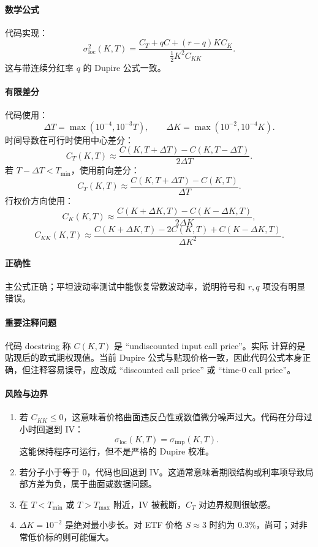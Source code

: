\documentclass[UTF8,a4paper,11pt]{ctexart}
\newcommand{\code}[1]{\texttt{\detokenize{#1}}}
\begin{document}
\paragraph{数学公式}
代码实现：
\[
\sigma_{\mathrm{loc}}^2(K,T)
=
\frac{
C_T+qC+(r-q)KC_K
}{
\frac12K^2C_{KK}
}.
\]
这与带连续分红率 \(q\) 的 Dupire 公式一致。

\paragraph{有限差分}
代码使用：
\[
\Delta T=\max(10^{-4},10^{-3}T),
\qquad
\Delta K=\max(10^{-2},10^{-4}K).
\]
时间导数在可行时使用中心差分：
\[
C_T(K,T)\approx
\frac{C(K,T+\Delta T)-C(K,T-\Delta T)}{2\Delta T}.
\]
若 \(T-\Delta T<T_{\min}\)，使用前向差分：
\[
C_T(K,T)\approx
\frac{C(K,T+\Delta T)-C(K,T)}{\Delta T}.
\]
行权价方向使用：
\[
C_K(K,T)\approx
\frac{C(K+\Delta K,T)-C(K-\Delta K,T)}{2\Delta K},
\]
\[
C_{KK}(K,T)\approx
\frac{C(K+\Delta K,T)-2C(K,T)+C(K-\Delta K,T)}{\Delta K^2}.
\]

\paragraph{正确性}
主公式正确；平坦波动率测试中能恢复常数波动率，说明符号和 \(r,q\) 项没有明显错误。

\paragraph{重要注释问题}
代码 docstring 称 \(C(K,T)\) 是 ``undiscounted input call price''。实际 \code{black_scholes_call} 计算的是贴现后的欧式期权现值。当前 Dupire 公式与贴现价格一致，因此代码公式本身正确，但注释容易误导，应改成 ``discounted call price'' 或 ``time-0 call price''。

\paragraph{风险与边界}
\begin{enumerate}
  \item 若 \(C_{KK}\le 0\)，这意味着价格曲面违反凸性或数值微分噪声过大。代码在分母过小时回退到 IV：
  \[
  \sigma_{\mathrm{loc}}(K,T)=\sigma_{\mathrm{imp}}(K,T).
  \]
  这能保持程序可运行，但不是严格的 Dupire 校准。
  \item 若分子小于等于 0，代码也回退到 IV。这通常意味着期限结构或利率项导致局部方差为负，属于曲面或数据问题。
  \item 在 \(T<T_{\min}\) 或 \(T>T_{\max}\) 附近，IV 被截断，\(C_T\) 对边界规则很敏感。
  \item \(\Delta K=10^{-2}\) 是绝对最小步长。对 ETF 价格 \(S\approx 3\) 时约为 0.3\%，尚可；对非常低价标的则可能偏大。
\end{enumerate}
\end{document}
